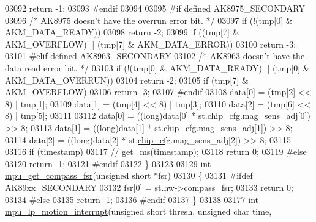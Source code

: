 \begin{DoxyCode}
{{{{{{{{{{{{{{{{{{{{{{{{{{{{{{{{{{03092         \textcolor{keywordflow}{return} -1;
03093 \textcolor{preprocessor}{#endif}
03094 
03095 \textcolor{preprocessor}{#if defined AK8975\_SECONDARY}
03096     \textcolor{comment}{/* AK8975 doesn't have the overrun error bit. */}
03097     \textcolor{keywordflow}{if} (!(tmp[0] & AKM\_DATA\_READY))
03098         \textcolor{keywordflow}{return} -2;
03099     \textcolor{keywordflow}{if} ((tmp[7] & AKM\_OVERFLOW) || (tmp[7] & AKM\_DATA\_ERROR))
03100         \textcolor{keywordflow}{return} -3;
03101 \textcolor{preprocessor}{#elif defined AK8963\_SECONDARY}
03102     \textcolor{comment}{/* AK8963 doesn't have the data read error bit. */}
03103     \textcolor{keywordflow}{if} (!(tmp[0] & AKM\_DATA\_READY) || (tmp[0] & AKM\_DATA\_OVERRUN))
03104         \textcolor{keywordflow}{return} -2;
03105     \textcolor{keywordflow}{if} (tmp[7] & AKM\_OVERFLOW)
03106         \textcolor{keywordflow}{return} -3;
03107 \textcolor{preprocessor}{#endif}
03108     data[0] = (tmp[2] << 8) | tmp[1];
03109     data[1] = (tmp[4] << 8) | tmp[3];
03110     data[2] = (tmp[6] << 8) | tmp[5];
03111 
03112     data[0] = ((long)data[0] * st.\hyperlink{structgyro__state__s_ac895217592e2084bd520b0be8e9d20ee}{chip\_cfg}.mag\_sens\_adj[0]) >> 8;
03113     data[1] = ((long)data[1] * st.\hyperlink{structgyro__state__s_ac895217592e2084bd520b0be8e9d20ee}{chip\_cfg}.mag\_sens\_adj[1]) >> 8;
03114     data[2] = ((long)data[2] * st.\hyperlink{structgyro__state__s_ac895217592e2084bd520b0be8e9d20ee}{chip\_cfg}.mag\_sens\_adj[2]) >> 8;
03115 
03116     \textcolor{keywordflow}{if} (timestamp)
03117        \textcolor{comment}{// get\_ms(timestamp);}
03118     \textcolor{keywordflow}{return} 0;
03119 \textcolor{preprocessor}{#else}
03120     \textcolor{keywordflow}{return} -1;
03121 \textcolor{preprocessor}{#endif}
03122 \}
03123 
\hypertarget{inv__mpu_8c_source.tex_l03129}{}\hyperlink{group___d_r_i_v_e_r_s_gade8589573d09e0f14b84130428f286df}{03129} \textcolor{keywordtype}{int} \hyperlink{group___d_r_i_v_e_r_s_gade8589573d09e0f14b84130428f286df}{mpu\_get\_compass\_fsr}(\textcolor{keywordtype}{unsigned} \textcolor{keywordtype}{short} *fsr)
03130 \{
03131 \textcolor{preprocessor}{#ifdef AK89xx\_SECONDARY}
03132     fsr[0] = st.\hyperlink{structgyro__state__s_a5bac30a96752691e4cc723735060e360}{hw}->compass\_fsr;
03133     \textcolor{keywordflow}{return} 0;
03134 \textcolor{preprocessor}{#else}
03135     \textcolor{keywordflow}{return} -1;
03136 \textcolor{preprocessor}{#endif}
03137 \}
03138 
\hypertarget{inv__mpu_8c_source.tex_l03177}{}\hyperlink{group___d_r_i_v_e_r_s_ga7d0b3259346898ccd1ba6ef78bf7df97}{03177} \textcolor{keywordtype}{int} \hyperlink{group___d_r_i_v_e_r_s_ga7d0b3259346898ccd1ba6ef78bf7df97}{mpu\_lp\_motion\_interrupt}(\textcolor{keywordtype}{unsigned} \textcolor{keywordtype}{short} thresh, \textcolor{keywordtype}{unsigned} \textcolor{keywordtype}{char} time,
}}}}}}}}}}}}}}}}}}}}}}}}}}}}}}}}}}
\end{DoxyCode}
